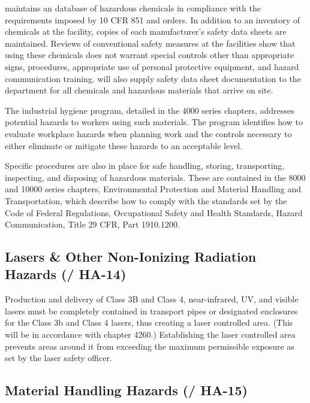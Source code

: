 \fnal maintains an database of hazardous chemicals in compliance with
the requirements imposed by 10 CFR 851 and  orders. In
addition to an inventory of chemicals at the facility, copies of each
manufacturer's safety data sheets are maintained. Reviews of
conventional safety measures at the facilities show that using these
chemicals does not warrant special controls other than appropriate
signs, procedures, appropriate use of personal protective equipment,
and hazard communication training.  will also supply
safety data sheet documentation to the  
department for all chemicals and hazardous materials that arrive on
site.

The industrial hygiene program, detailed in the  4000
series chapters, addresses potential hazards to workers using such
materials. The program identifies how to evaluate workplace hazards
when planning work and the controls necessary to either eliminate or
mitigate these hazards to an acceptable level.

Specific procedures are also in place for safe handling, storing,
transporting, inspecting, and disposing of hazardous materials. These
are contained in the  8000 and 10000 series chapters,
Environmental Protection and Material Handling and Transportation,
which describe how to comply with the standards set by the Code of
Federal Regulations, Occupational Safety and Health Standards, Hazard
Communication, Title 29 CFR, Part 1910.1200.


\subsection{Lasers \& Other Non-Ionizing Radiation Hazards (/ HA-14)}

Production and delivery of Class 3B and Class 4, near-infrared, UV,
and visible lasers must be completely contained in transport pipes or
designated enclosures for the Class 3b and Class 4 lasers, thus
creating a laser controlled area. (This will be in accordance with
\fnal {} chapter 4260.)  Establishing the laser controlled
area prevents areas around it from exceeding the maximum permissible
exposure as set by the \fnal laser safety officer.

\subsection{Material Handling Hazards (/ HA-15)}


